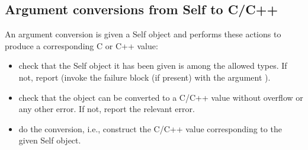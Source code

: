 \documentclass[letterpaper,10pt,english]{sphinxmanual}
\begin{document}

\subsection{Argument conversions \textendash{} from Self to C/C++}
\label{\detokenize{vmref:index-82}}\label{\detokenize{vmref:argument-conversions-from-self-to-c-c}}
An argument conversion is given a Self object and performs these actions to produce a corresponding
C or C++ value:
\begin{itemize}
\item {} 
check that the Self object it has been given is among the allowed types. If not, report
 (invoke the failure block (if present) with the argument ).

\item {} 
check that the object can be converted to a C/C++ value without overflow or any other error.
If not, report the relevant error.

\item {} 
do the conversion, i.e., construct the C/C++ value corresponding to the given Self object.

\end{itemize}

\end{document}
